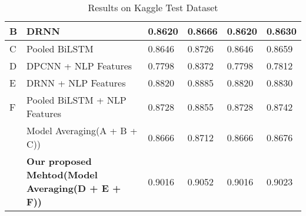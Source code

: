 \documentclass[sigconf]{acmart}
\begin{document}
\begin{table*}[h]
\begin{minipage}{\textwidth}
{\begin{tabular}{|l|l|l|l|l|l|}
                B                     &         DRNN                             &          0.8620                              &           0.8666                             &                  0.8620                    &                  0.8630                          \\ \hline
                 C                    &  Pooled BiLSTM                                &            0.8646                            &          0.8726                               &                 0.8646                     &              0.8659                              \\ \hline
                                     
                  D                   &    DPCNN  + NLP Features                                &               0.7798                         &                          0.8372               &              0.7798                        &       0.7812                                     \\ \hline
                   E                  &         DRNN + NLP Features                             &        0.8820                                &                   0.8885                      &             0.8820                         &       0.8830                                     \\ \hline
                    F                 &  Pooled BiLSTM  + NLP Features                              &          0.8728                             &                    0.8855                   &           0.8728                        &          0.8742                                 \\ \hline
                                     &    Model Averaging(A + B + C))                                &                    0.8666                            &          0.8712                               &                 0.8666                     &              0.8676                                    \\ \hline
                                                                          &     \textbf{ Our proposed Mehtod(Model Averaging(D + E + F))}                                &            0.9016                           &                 0.9052                        &                0.9016                      &       0.9023                                     \\ \hline
\end{tabular}}
\caption{Results on Kaggle Test Dataset}
\label{tab:kaggle}
\end{minipage}
\vspace{-8mm}
\end{table*}
\end{document}
